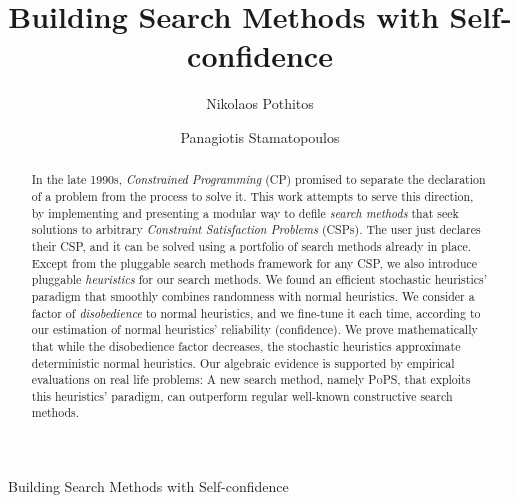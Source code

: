 \documentclass{ws-ijait}
\begin{document}
         {Building Search Methods with Self-confidence}

%
\catchline{}{}{}{}{}
%

\title{Building Search Methods with Self-confidence}

\author{Nikolaos Pothitos \and Panagiotis Stamatopoulos}

\address{Department of Informatics and Telecommunications \\
         National and Kapodistrian University of Athens \\
         Panepistimiopolis, 157\,84 Athens, Greece \\
         \{pothitos,takis\}@di.uoa.gr}

\maketitle

\begin{history}
\end{history}

\begin{abstract}
  In the late 1990s, \emph{Constrained Programming} (CP)
  promised to separate the declaration of a problem from the
  process to solve it. This work attempts to serve this
  direction, by implementing and presenting a modular way to
  defile \emph{search methods} that seek solutions to
  arbitrary \emph{Constraint Satisfaction Problems} (CSPs).
  The user just declares their CSP, and it can be solved
  using a portfolio of search methods already in place.
  Except from the pluggable search methods framework for any
  CSP, we also introduce pluggable \emph{heuristics} for our
  search methods. We found an efficient stochastic
  heuristics' paradigm that smoothly combines randomness
  with normal heuristics. We consider a factor of
  \emph{disobedience} to normal heuristics, and we fine-tune
  it each time, according to our estimation of normal
  heuristics' reliability (confidence). We prove
  mathematically that while the disobedience factor
  decreases, the stochastic heuristics approximate
  deterministic normal heuristics. Our algebraic evidence is
  supported by empirical evaluations on real life problems:
  A new search method, namely \textsc{PoPS}, that exploits
  this heuristics' paradigm, can outperform regular
  well-known constructive search methods.
\end{abstract}
\end{document}
